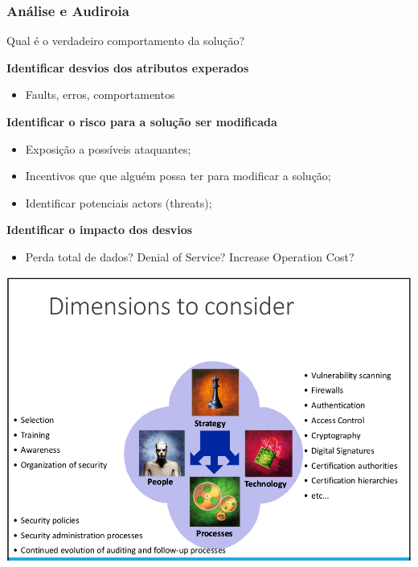 \documentclass{article}
\begin{document}
\pagebreak

\subsubsection{Análise e Audiroia}

Qual é o verdadeiro comportamento da solução?

\begin{flushleft}
  \textbf{Identificar desvios dos atributos experados}
  \begin{itemize}
    \item Faults, erros, comportamentos
  \end{itemize}

  \textbf{Identificar o risco para a solução ser modificada}
  \begin{itemize}
    \item Exposição a possíveis ataquantes;
    \item Incentivos que que alguém possa ter para modificar a solução;
    \item Identificar potenciais actors (threats);
  \end{itemize}

  \textbf{Identificar o impacto dos desvios}
  \begin{itemize}
    \item Perda total de dados? Denial of Service? Increase Operation Cost?
  \end{itemize}
\end{flushleft}

\begin{center}
  \includegraphics[scale=0.3]{2}
\end{center}
\end{document}
